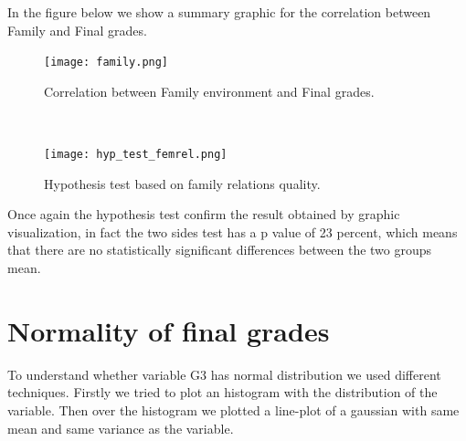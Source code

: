 \documentclass[a4paper, 11pt]{article}
\theoremstyle{definition}
\numberwithin{equation}{section}		%
\numberwithin{table}{section}				%
\begin{document}
\begin{itemize}
In the figure below we show a summary graphic for the correlation between Family and Final grades.
\begin{figure}[ht]\centering
\texttt{[image: family.png]}
\caption{Correlation between Family environment and Final grades.}
\end{figure}
\\[0.2in]
\begin{figure}[H]\centering
\texttt{[image: hyp\_test\_femrel.png]}
\caption{Hypothesis test based on family relations quality.}
\end{figure}

Once again the hypothesis test confirm the result obtained by graphic visualization, in fact the two sides test has a p value of 23 percent, 
which means that there are no statistically significant differences between the two groups mean.
\end{itemize}
\bigskip
\newpage
\section{Normality of final grades}
To understand whether variable G3 has normal distribution we used different
techniques. Firstly we tried to plot an histogram with the distribution of the variable. Then over the histogram we plotted a line-plot of a gaussian with same mean and same variance as the variable.
\end{document}
